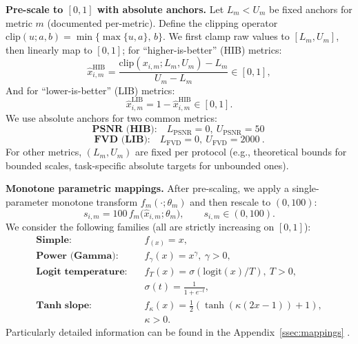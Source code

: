 \textbf{Pre-scale to $[0,1]$ with absolute anchors.}
Let $L_m<U_m$ be fixed anchors for metric $m$ (documented per-metric).
Define the clipping operator $\mathrm{clip}(u;a,b)=\min\{\max\{u,a\},\,b\}$.
We first clamp raw values to $[L_m,U_m]$, then linearly map to $[0,1]$; for “higher-is-better” (HIB) metrics:
\[
\hat x_{i,m}^{\mathrm{HIB}}
=\frac{\mathrm{clip}(x_{i,m};L_m,U_m)-L_m}{U_m-L_m}\in[0,1],
\]
And for “lower-is-better” (LIB) metrics:
\[
\hat x_{i,m}^{\mathrm{LIB}}
=1-\hat x_{i,m}^{\mathrm{HIB}}\in[0,1].
\]
We use absolute anchors for two common metrics:
\[
\textbf{PSNR (HIB):}\quad L_{\text{PSNR}}=0,\ U_{\text{PSNR}}=50\
\]
\[
\textbf{FVD (LIB):}\quad L_{\text{FVD}}=0,\ U_{\text{FVD}}=2000\ .
\]
For other metrics, $(L_m,U_m)$ are fixed per protocol (e.g., theoretical bounds for bounded scales, task-specific absolute targets for unbounded ones).

\textbf{Monotone parametric mappings.}
After pre-scaling, we apply a single-parameter monotone transform $f_m(\cdot;\theta_m)$ and then rescale to $(0,100)$:
\[
s_{i,m}=100\,f_m\!\big(\hat x_{i,m};\theta_m\big),\qquad s_{i,m}\in(0,100).
\]
We consider the following families (all are strictly increasing on $[0,1]$):
\[
\begin{aligned}
\textbf{Simple:} &\quad f_(x) = x,\\[3pt]
\textbf{Power (Gamma):} &\quad f_\gamma(x) = x^\gamma,\ \gamma>0,\\[3pt]
\textbf{Logit temperature:} &\quad
f_T(x) = \sigma(\mathrm{logit}(x)/T),\ T>0,\\
&\quad \sigma(t)=\tfrac{1}{1+e^{-t}},\\[3pt]
\textbf{Tanh slope:} &\quad
f_\kappa(x)=\tfrac12(\tanh(\kappa(2x-1))+1),\\ 
&\quad \kappa>0.
\end{aligned}
\]
Particularly detailed information can be found in the Appendix~\ref{ssec:mappings}
.


